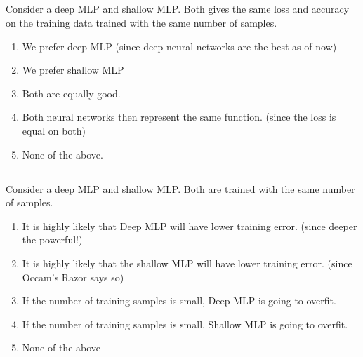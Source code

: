 
\begin{frame}
\section{}
Consider a deep MLP and shallow MLP. Both gives the same loss and accuracy on the training data trained with the same number of samples.
\begin{enumerate}[label=(\Alph*)]
\item We prefer deep MLP (since deep neural networks are the best as of now)
\item We prefer shallow MLP   %
\item Both are equally good.
\item Both neural networks then represent the same function. (since the loss is equal on both)
\item None of the above.  %

\end{enumerate}

\end{frame}


\begin{frame}
\section{}
Consider a deep MLP and shallow MLP. Both are trained with the same number of samples.

\begin{enumerate}[label=(\Alph*)]
\item It is highly likely that Deep MLP will have lower training error. (since deeper the powerful!)    %
\item It is highly likely that the shallow MLP will have lower training error. (since Occam's Razor says so)
\item If the number of training samples is small, Deep MLP is going to overfit.   %
\item If the number of training samples is small, Shallow MLP is going to overfit.
\item None of the above    %
\end{enumerate}
\end{frame}
